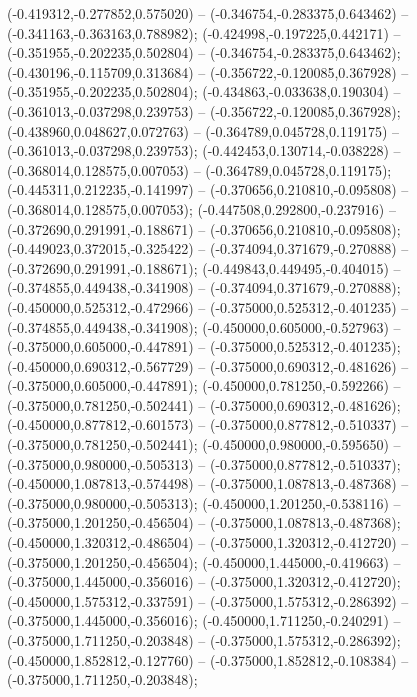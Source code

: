  (-0.419312,-0.277852,0.575020) -- (-0.346754,-0.283375,0.643462) -- (-0.341163,-0.363163,0.788982);
 (-0.424998,-0.197225,0.442171) -- (-0.351955,-0.202235,0.502804) -- (-0.346754,-0.283375,0.643462);
 (-0.430196,-0.115709,0.313684) -- (-0.356722,-0.120085,0.367928) -- (-0.351955,-0.202235,0.502804);
 (-0.434863,-0.033638,0.190304) -- (-0.361013,-0.037298,0.239753) -- (-0.356722,-0.120085,0.367928);
 (-0.438960,0.048627,0.072763) -- (-0.364789,0.045728,0.119175) -- (-0.361013,-0.037298,0.239753);
 (-0.442453,0.130714,-0.038228) -- (-0.368014,0.128575,0.007053) -- (-0.364789,0.045728,0.119175);
 (-0.445311,0.212235,-0.141997) -- (-0.370656,0.210810,-0.095808) -- (-0.368014,0.128575,0.007053);
 (-0.447508,0.292800,-0.237916) -- (-0.372690,0.291991,-0.188671) -- (-0.370656,0.210810,-0.095808);
 (-0.449023,0.372015,-0.325422) -- (-0.374094,0.371679,-0.270888) -- (-0.372690,0.291991,-0.188671);
 (-0.449843,0.449495,-0.404015) -- (-0.374855,0.449438,-0.341908) -- (-0.374094,0.371679,-0.270888);
 (-0.450000,0.525312,-0.472966) -- (-0.375000,0.525312,-0.401235) -- (-0.374855,0.449438,-0.341908);
 (-0.450000,0.605000,-0.527963) -- (-0.375000,0.605000,-0.447891) -- (-0.375000,0.525312,-0.401235);
 (-0.450000,0.690312,-0.567729) -- (-0.375000,0.690312,-0.481626) -- (-0.375000,0.605000,-0.447891);
 (-0.450000,0.781250,-0.592266) -- (-0.375000,0.781250,-0.502441) -- (-0.375000,0.690312,-0.481626);
 (-0.450000,0.877812,-0.601573) -- (-0.375000,0.877812,-0.510337) -- (-0.375000,0.781250,-0.502441);
 (-0.450000,0.980000,-0.595650) -- (-0.375000,0.980000,-0.505313) -- (-0.375000,0.877812,-0.510337);
 (-0.450000,1.087813,-0.574498) -- (-0.375000,1.087813,-0.487368) -- (-0.375000,0.980000,-0.505313);
 (-0.450000,1.201250,-0.538116) -- (-0.375000,1.201250,-0.456504) -- (-0.375000,1.087813,-0.487368);
 (-0.450000,1.320312,-0.486504) -- (-0.375000,1.320312,-0.412720) -- (-0.375000,1.201250,-0.456504);
 (-0.450000,1.445000,-0.419663) -- (-0.375000,1.445000,-0.356016) -- (-0.375000,1.320312,-0.412720);
 (-0.450000,1.575312,-0.337591) -- (-0.375000,1.575312,-0.286392) -- (-0.375000,1.445000,-0.356016);
 (-0.450000,1.711250,-0.240291) -- (-0.375000,1.711250,-0.203848) -- (-0.375000,1.575312,-0.286392);
 (-0.450000,1.852812,-0.127760) -- (-0.375000,1.852812,-0.108384) -- (-0.375000,1.711250,-0.203848);
